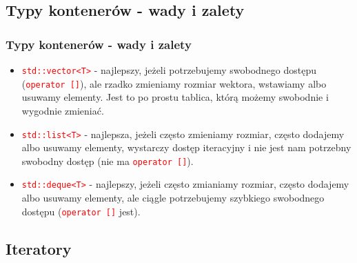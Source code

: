 \documentclass[compress]{beamer}
\newcommand{\red}[1]{\textcolor{red}{#1}}
\newcommand{\code}[1]{\texttt{\red{#1}}}
\begin{document}

\subsection{Typy kontenerów - wady i zalety}

\begin{frame}

  \frametitle{Typy kontenerów - wady i zalety}

  \begin{itemize}

  \item \code{std::vector{<}T{>}} - najlepszy, jeżeli potrzebujemy
    swobodnego dostępu (\code{operator []}), ale rzadko zmieniamy
    rozmiar wektora, wstawiamy albo usuwamy elementy.  Jest to po
    prostu tablica, którą możemy swobodnie i wygodnie zmieniać.

  \item \code{std::list{<}T{>}} - najlepsza, jeżeli często zmieniamy
    rozmiar, często dodajemy albo usuwamy elementy, wystarczy dostęp
    iteracyjny i nie jest nam potrzebny swobodny dostęp (nie ma
    \code{operator []}).

  \item \code{std::deque{<}T{>}} - najlepszy, jeżeli często zmianiamy
    rozmiar, często dodajemy albo usuwamy elementy, ale ciągle
    potrzebujemy szybkiego swobodnego dostępu (\code{operator []}
    jest).

  \end{itemize}

\end{frame}


\subsection{Iteratory}
\end{document}
